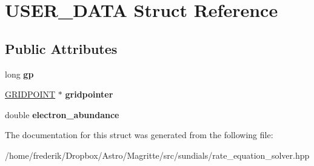\hypertarget{structUSER__DATA}{}\section{U\+S\+E\+R\+\_\+\+D\+A\+TA Struct Reference}
\label{structUSER__DATA}
\subsection*{Public Attributes}
\begin{DoxyCompactItemize}
\item 
\mbox{\label{structUSER__DATA_a68317b55e9778bb4145cb932bfeb6ee8}} 
long {\bfseries gp}
\item 
\mbox{\label{structUSER__DATA_a2fbfae29f27a6f8a9a307d2109f80258}} 
\mbox{\hyperlink{structGRIDPOINTS}{G\+R\+I\+D\+P\+O\+I\+NT}} $\ast$ {\bfseries gridpointer}
\item 
\mbox{\label{structUSER__DATA_a1a2f21156f9834db79f6c40d6a755c8f}} 
double {\bfseries electron\+\_\+abundance}
\end{DoxyCompactItemize}


The documentation for this struct was generated from the following file\+:\begin{DoxyCompactItemize}
\item 
/home/frederik/\+Dropbox/\+Astro/\+Magritte/src/sundials/rate\+\_\+equation\+\_\+solver.\+hpp\end{DoxyCompactItemize}
